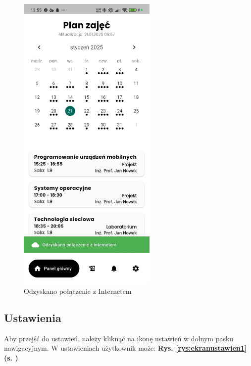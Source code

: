 \begin{figure}[htp!]
	\centering
	\includegraphics[width=0.6\textwidth]{rys/app_reconnected.jpg}
	\caption{Odzyskano połączenie z Internetem}
	\label{rys:pushnotv2}
\end{figure}

\newpage

\subsection{Ustawienia}

Aby przejść do ustawień, należy kliknąć na ikonę ustawień w dolnym pasku nawigacyjnym. W ustawieniach użytkownik może: \textbf{Rys. \ref{rys:ekranustawien1} (s. \pageref{rys:ekranustawien1})}

